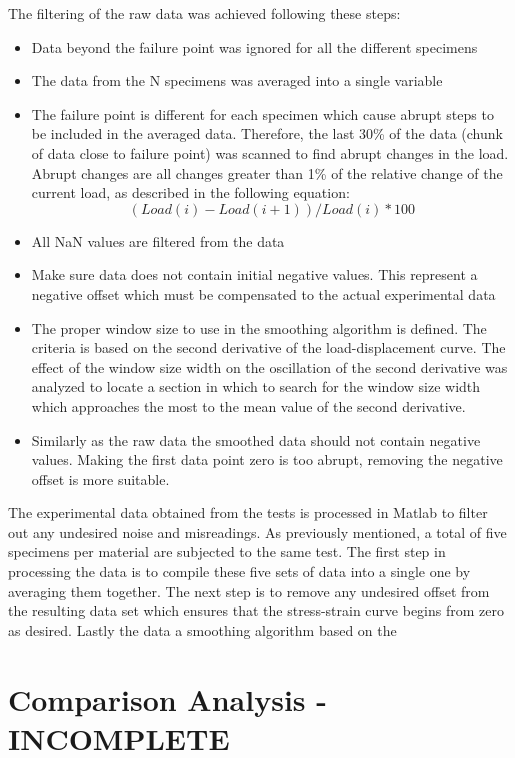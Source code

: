 The filtering of the raw data was achieved following these steps:
\begin{itemize}
    \item Data beyond the failure point was ignored for all the different specimens
    \item The data from the N specimens was averaged into a single variable
    \item The failure point is different for each specimen which cause abrupt steps to be included in the averaged data. Therefore, the last 30\% of the data (chunk of data close to failure point) was scanned to find abrupt changes in the load. Abrupt changes are all changes greater than 1\% of the relative change of the current load, as described in the following equation:
    \begin{equation}
        (Load(i) - Load(i+1) ) / Load(i) * 100
    \end{equation}
    \item All NaN values are filtered from the data
    \item Make sure data does not contain initial negative values. This represent a negative offset which must be compensated to the actual experimental data
    \item The proper window size to use in the smoothing algorithm is defined. The criteria is based on the second derivative of the load-displacement curve. The effect of the window size width on the oscillation of the second derivative was analyzed to locate a section in which to search for the window size width which approaches the most to the mean value of the second derivative.
    \item Similarly as the raw data the smoothed data should not contain negative values. Making the first data point zero is too abrupt, removing the negative offset is more suitable.
\end{itemize}

The experimental data obtained from the tests is processed in Matlab to filter out any undesired noise and misreadings. As previously mentioned, a total of five specimens per material are subjected to the same test. The first step in processing the data is to compile these five sets of data into a single one by averaging them together. The next step is to remove any undesired offset from the resulting data set which ensures that the stress-strain curve begins from zero as desired. Lastly the data a smoothing algorithm based on the 

\section{Comparison Analysis - INCOMPLETE}

